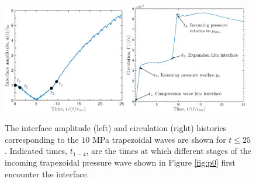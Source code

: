 \begin{figure}[h] 
  \centering
  \includegraphics[width=0.48\textwidth]{./figs/lung_figs/trapz10_intf_schematic}
  \includegraphics[width=0.48\textwidth]{./figs/lung_figs/trapz10_circ_schematic}
  \caption[The interface amplitude and circulation histories for the $10$ MPa trapezoidal wave]{The interface amplitude (left) and circulation (right)
    histories corresponding to the $10$ MPa trapezoidal waves are
    shown for $t\leq25$. Indicated times, $t_{1-4}$, are the times at
    which different stages of the incoming trapezoidal pressure wave
    shown in Figure \ref{fig:p0} first encounter the interface.}
  \label{fig:trapz10_circ_interface}
\end{figure}
%
%
